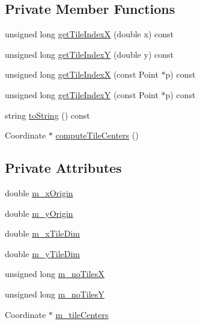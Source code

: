 \subsection*{Private Member Functions}
\begin{DoxyCompactItemize}
\item 
unsigned long \hyperlink{class_grid_a5ab67c336ac08c690a0e8b03c12f02e5}{get\+Tile\+IndexX} (double x) const
\item 
unsigned long \hyperlink{class_grid_ad745f856bb2b27382118ac03fafc06b4}{get\+Tile\+IndexY} (double y) const
\item 
unsigned long \hyperlink{class_grid_af4094832e2adedbbd47889973f5a40da}{get\+Tile\+IndexX} (const Point $\ast$p) const
\item 
unsigned long \hyperlink{class_grid_ae1eeb3b42007ae1cf19cfaf0d846fb9a}{get\+Tile\+IndexY} (const Point $\ast$p) const
\item 
string \hyperlink{class_grid_ad48d195b5e333a94a3a14d6395252b2a}{to\+String} () const
\item 
Coordinate $\ast$ \hyperlink{class_grid_a8948d61db8ba1bda2260590677eaaa01}{compute\+Tile\+Centers} ()
\end{DoxyCompactItemize}
\subsection*{Private Attributes}
\begin{DoxyCompactItemize}
\item 
double \hyperlink{class_grid_ae109d428ac5489815748e92fdde1b91f}{m\+\_\+x\+Origin}
\item 
double \hyperlink{class_grid_a16b2fc5a6e96ad2d59d59b52db83f4aa}{m\+\_\+y\+Origin}
\item 
double \hyperlink{class_grid_a48c3d1fc34a14bff8b9176558a8b6f4e}{m\+\_\+x\+Tile\+Dim}
\item 
double \hyperlink{class_grid_a497eeffc4a16a021e15ecbc130f4f644}{m\+\_\+y\+Tile\+Dim}
\item 
unsigned long \hyperlink{class_grid_a177bfdc70436c25a1510d1abe19e34c1}{m\+\_\+no\+TilesX}
\item 
unsigned long \hyperlink{class_grid_a8fe14c4781dfd5623922fcc1f9c10130}{m\+\_\+no\+TilesY}
\item 
Coordinate $\ast$ \hyperlink{class_grid_a27b99b13ac7e5bec81f7b8704bc3405a}{m\+\_\+tile\+Centers}
\end{DoxyCompactItemize}


